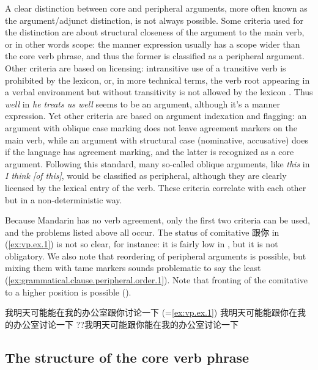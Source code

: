 \documentclass[UTF8, a4paper, oneside, scheme=plain, 12pt]{ctexrep}
\newcommand{\form}[1]{\emph{#1}}
\begin{document}
A clear distinction between core and peripheral arguments,
more often known as the argument/adjunct distinction, is not always possible.
Some criteria used for the distinction are about structural closeness of the argument to the main verb, or in other words scope:
the manner expression usually has a scope wider than the core verb phrase,
and thus the former is classified as a peripheral argument.
Other criteria are based on licensing: intransitive use of a transitive verb is prohibited by the lexicon,
or, in more technical terms, the verb root appearing in a verbal environment but without transitivity is not allowed by the lexicon \citep{siddiqi2009syntax}.
Thus \form{well} in \form{he treats us well} seems to be an argument, although it's a manner expression.
Yet other criteria are based on argument indexation and flagging:
an argument with oblique case marking does not leave agreement markers on the main verb,
while an argument with structural case (nominative, accusative) does
if the language has agreement marking,
and the latter is recognized as a core argument.
Following this standard, many so-called oblique arguments,
like \form{this} in \form{I think [of this]}, would be classified as peripheral,
although they are clearly licensed by the lexical entry of the verb.
These criteria correlate with each other but in a non-deterministic way.

Because Mandarin has no verb agreement, only the first two criteria can be used,
and the problems listed above all occur.
The status of comitative 跟你 in (\ref{ex:vp.ex.1}) is not so clear, for instance:
it is fairly low in , but it is not obligatory.
We also note that reordering of peripheral arguments is possible,
but mixing them with \acs{tame} markers sounds problematic to say the least
(\ref{ex:grammatical.clause.peripheral.order.1}).
Note that fronting of the comitative to a higher position is possible ().

\begin{exe}
    \ex\label{ex:grammatical.clause.peripheral.order.1} \begin{xlist}
        \ex 我明天可能能在我的办公室跟你讨论一下 (=\ref{ex:vp.ex.1})
        \ex 我明天可能能跟你在我的办公室讨论一下
        \ex ??我明天可能跟你能在我的办公室讨论一下
    \end{xlist}
\end{exe}

\subsection{The structure of the core verb phrase}\label{sec:grammatical.clause.core-vp}
\end{document}
